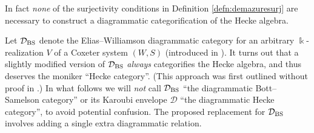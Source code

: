 \documentclass{amsart}
\theoremstyle{plain}
\theoremstyle{definition}
\theoremstyle{remark}
\numberwithin{equation}{section}
\begin{document}


In fact \emph{none} of the surjectivity conditions in Definition \ref{defn:demazuresurj} are necessary to construct a diagrammatic categorification of the Hecke algebra.

Let $\mathcal{D}_{\rm BS}$ denote the Elias--Williamson diagrammatic category for an arbitrary $\Bbbk$-realization $V$ of a Coxeter system $(W,S)$ (introduced in \cite{EW-SoergelCalc}). 
It turns out that a slightly modified version of $\mathcal{D}_{\rm BS}$ \emph{always} categorifies the Hecke algebra, and thus deserves the moniker ``Hecke category''. 
(This approach was first outlined without proof in \cite[Remark~1.15]{bdhn-hsp}.) 
In what follows we will \emph{not} call $\mathcal{D}_{\rm BS}$ ``the diagrammatic Bott--Samelson category'' or its Karoubi envelope $\mathcal{D}$ ``the diagrammatic Hecke category'', to avoid potential confusion.
The proposed replacement for $\mathcal{D}_{\rm BS}$ involves adding a single extra diagrammatic relation.
\end{document}
